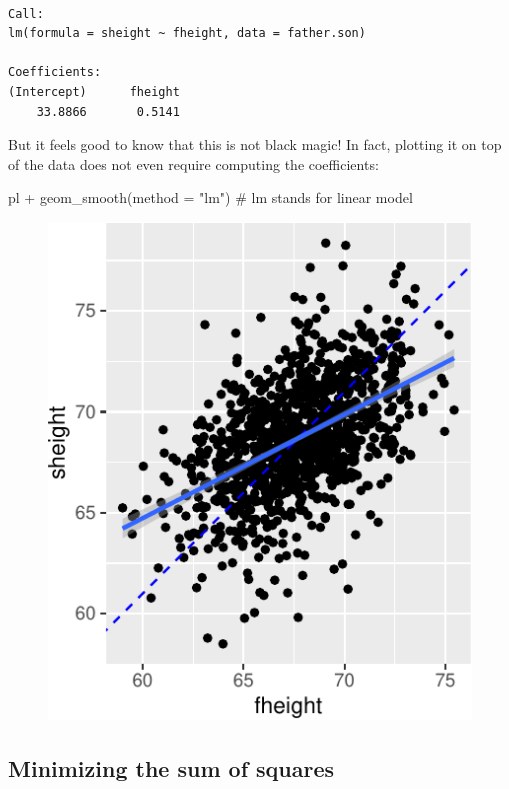 \documentclass[
  letterpaper,
  DIV=11,
  numbers=noendperiod]{scrreprt}
\newenvironment{Shaded}{\begin{snugshade}}{\end{snugshade}}
\newcommand{\AttributeTok}[1]{\textcolor[rgb]{0.40,0.45,0.13}{#1}}
\newcommand{\CommentTok}[1]{\textcolor[rgb]{0.37,0.37,0.37}{#1}}
\newcommand{\FunctionTok}[1]{\textcolor[rgb]{0.28,0.35,0.67}{#1}}
\newcommand{\NormalTok}[1]{\textcolor[rgb]{0.00,0.23,0.31}{#1}}
\newcommand{\SpecialCharTok}[1]{\textcolor[rgb]{0.37,0.37,0.37}{#1}}
\newcommand{\StringTok}[1]{\textcolor[rgb]{0.13,0.47,0.30}{#1}}
\begin{document}
\begin{verbatim}

Call:
lm(formula = sheight ~ fheight, data = father.son)

Coefficients:
(Intercept)      fheight  
    33.8866       0.5141  
\end{verbatim}

But it feels good to know that this is not black magic! In fact,
plotting it on top of the data does not even require computing the
coefficients:

\begin{Shaded}
\begin{Highlighting}[]
\NormalTok{pl }\SpecialCharTok{+} \FunctionTok{geom\_smooth}\NormalTok{(}\AttributeTok{method =} \StringTok{"lm"}\NormalTok{) }\CommentTok{\# lm stands for linear model}
\end{Highlighting}
\end{Shaded}

\begin{figure}[H]

{\centering \includegraphics{./08-linearreg_files/figure-pdf/unnamed-chunk-8-1.pdf}

}

\end{figure}

\hypertarget{minimizing-the-sum-of-squares}{%
\subsection{Minimizing the sum of
squares}\label{minimizing-the-sum-of-squares}}
\end{document}
